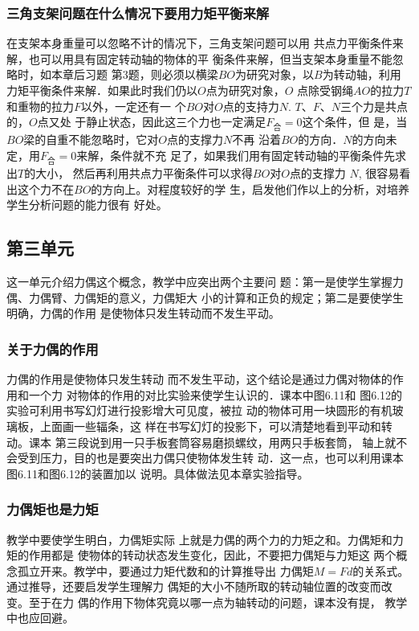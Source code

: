 \subsubsection{三角支架问题在什么情况下要用力矩平衡来解}

在支架本身重量可以忽略不计的情况下，三角支架问题可以用
共点力平衡条件来解，也可以用具有固定转动轴的物体的平
衡条件来解，但当支架本身重量不能忽略时，如本章后习题
第3题，则必须以横梁$BO$为研究对象，以$B$为转动轴，利用
力矩平衡条件来解．如果此时我们仍以$O$点为研究对象，$O$
点除受钢绳$AO$的拉力$T$和重物的拉力$F$以外，一定还有一
个$BO$对$O$点的支持力$N$. $T$、$F$、$N$三个力是共点的，$O$点又处
于静止状态，因此这三个力也一定满足$F_{\text{合}}=0$这个条件，但
是，当$BO$梁的自重不能忽略时，它对$O$点的支撑力$N$不再
沿着$BO$的方向．$N$的方向未定，用$F_{\text{合}}=0$来解，条件就不充
足了，如果我们用有固定转动轴的平衡条件先求出$T$的大小，
然后再利用共点力平衡条件可以求得$BO$对$O$点的支撑力
$N$, 很容易看出这个力不在$BO$的方向上。对程度较好的学
生，启发他们作以上的分析，对培养学生分析问题的能力很有
好处。


\subsection{第三单元}
这一单元介绍力偶这个概念，教学中应突出两个主要问
题：第一是使学生掌握力偶、力偶臂、力偶矩的意义，力偶矩大
小的计算和正负的规定；第二是要使学生明确，力偶的作用
是使物体只发生转动而不发生平动。
\subsubsection{关于力偶的作用}

力偶的作用是使物体只发生转动
而不发生平动，这个结论是通过力偶对物体的作用和一个力
对物体的作用的对比实验来使学生认识的．课本中图6.11和
图6.12的实验可利用书写幻灯进行投影增大可见度，被拉
动的物体可用一块圆形的有机玻璃板，上面画一些辐条，这
样在书写幻灯的投影下，可以清楚地看到平动和转动。课本
第三段说到用一只手板套筒容易磨损螺纹，用两只手板套筒，
轴上就不会受到压力，目的也是要突出力偶只使物体发生转
动．这一点，也可以利用课本图6.11和图6.12的装置加以
说明。具体做法见本章实验指导。

\subsubsection{力偶矩也是力矩}

教学中要使学生明白，力偶矩实际
上就是力偶的两个力的力矩之和。力偶矩和力矩的作用都是
使物体的转动状态发生变化，因此，不要把力偶矩与力矩这
两个概念孤立开来。教学中，要通过力矩代数和的计算推导出
力偶矩$M=Fd$的关系式。通过推导，还要启发学生理解力
偶矩的大小不随所取的转动轴位置的改变而改变。至于在力
偶的作用下物体究竟以哪一点为轴转动的问题，课本没有提，
教学中也应回避。


